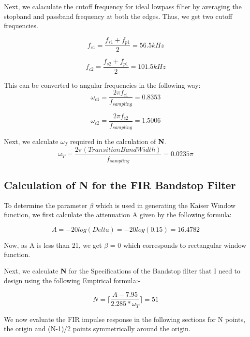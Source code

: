 \documentclass{article}
\begin{document}
Next, we calaculate the cutoff frequency for ideal lowpass filter by averaging the stopband and passband frequency at both the edges. Thus, we get two cutoff frequencies.

\begin{equation}
    f_{c1} = \frac{f_{s1} + f_{p1}}{2} = 56.5 kHz
\end{equation}

\begin{equation}
    f_{c2} = \frac{f_{s2} + f_{p1}}{2} = 101.5 kHz
\end{equation}

This can be converted to angular frequencies in the following way:
\begin{equation}
    \omega_{c1} = \frac{2\pi f_{c1}}{f_{sampling}} = 0.8353
\end{equation}

\begin{equation}
    \omega_{c2} = \frac{2\pi f_{c2}}{f_{sampling}} = 1.5006
\end{equation}


Next, we calculate $\omega_{T}$ required in the calculation of \textbf{N}.
\begin{equation}
    \omega_{T} = \frac{2\pi(Transition Band Width)}{f_{sampling}} = 0.0235\pi
\end{equation}


\subsection{Calculation of N for the FIR Bandstop Filter}

To determine the parameter $\beta$ which is used in generating the Kaiser Window function, we first calculate the attenuation A given by the following formula:

\begin{equation}
    A = -20log(Delta) = -20log(0.15) = 16.4782
\end{equation}

Now, as A is less than 21, we get $\beta$ = 0 which corresponds to rectangular window function.

Next, we calculate \textbf{N} for the Specifications of the Bandstop filter that I need to design using the following Empirical formula:- 

\[N = \lceil \frac{A - 7.95}{2.285*\omega_{T}} \rceil = 51\]

We now evaluate the FIR impulse response in the following sections for N points, the origin and (N-1)/2 points symmetrically around the origin.
\end{document}
